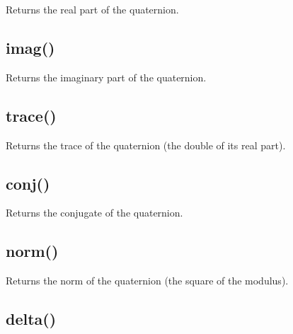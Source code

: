 \documentclass[letterpaper,10pt,english]{sphinxmanual}
\begin{document}
\begin{fulllineitems}
\end{fulllineitems}


Returns the real part of the quaternion.


\subsection{imag()}
\label{methods:imag}

\begin{fulllineitems}
\end{fulllineitems}


Returns the imaginary part of the quaternion.


\subsection{trace()}
\label{methods:trace}

\begin{fulllineitems}
\end{fulllineitems}


Returns the trace of the quaternion (the double of its real part).


\subsection{conj()}
\label{methods:conj}

\begin{fulllineitems}
\end{fulllineitems}


Returns the conjugate of the quaternion.


\subsection{norm()}
\label{methods:norm}

\begin{fulllineitems}
\end{fulllineitems}


Returns the norm of the quaternion (the square of the modulus).


\subsection{delta()}
\label{methods:delta}
\end{document}

